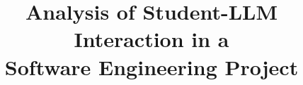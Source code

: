 \documentclass[10pt,conference]{IEEEtran}
\begin{document}
\title{Analysis of Student-LLM Interaction in a \\Software Engineering Project}



\maketitle









%



\end{document}
